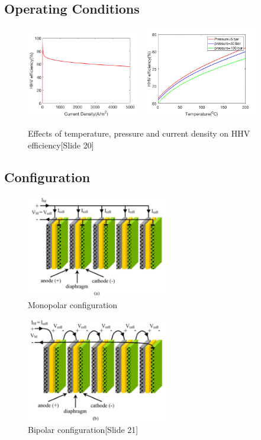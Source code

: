     
  \subsection{Operating Conditions}
\begin{figure}[H]
\centering
\includegraphics[width=0.45\textwidth]{pres1.png}
\includegraphics[width=0.45\textwidth]{pres2.png}
\caption{Effects of temperature, pressure and current density on HHV efficiency[Slide 20]} 
\end{figure} 

\subsection{Configuration}
\begin{figure}[H]
\centering
\includegraphics[width=0.55\textwidth]{monopolar.png}
\caption{Monopolar configuration}
\end{figure}
\begin{figure}[H]
\includegraphics[width=0.55\textwidth]{bipolar.png}
\caption{Bipolar configuration[Slide 21]} 
\end{figure} 


